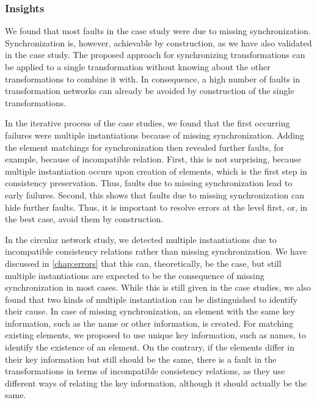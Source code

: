 \subsubsection{Insights}

We found that most faults in the case study were due to missing synchronization.
Synchronization is, however, achievable by construction, as we have also validated in the case study.
The proposed approach for synchronizing transformations can be applied to a single transformation without knowing about the other transformations to combine it with.
In consequence, a high number of faults in transformation networks can already be avoided by construction of the single transformations.

In the iterative process of the case studies, we found that the first occurring failures were multiple instantiations because of missing synchronization.
Adding the element matchings for synchronization then revealed further faults, for example, because of incompatible relation.
First, this is not surprising, because multiple instantiation occurs upon creation of elements, which is the first step in consistency preservation.
Thus, faults due to missing synchronization lead to early failures.
Second, this shows that faults due to missing synchronization can hide further faults.
Thus, it is important to resolve errors at the \leveltransformation level first, or, in the best case, avoid them by construction.

In the circular network study, we detected multiple instantiations due to incompatible consistency relations rather than missing synchronization.
We have discussed in \autoref{chap:errors} that this can, theoretically, be the case, but still multiple instantiations are expected to be the consequence of missing synchronization in most cases.
While this is still given in the case studies, we also found that two kinds of multiple instantiation can be distinguished to identify their cause.
In case of missing synchronization, an element with the same key information, such as the name or other information, is created.
For matching existing elements, we proposed to use unique key information, such as names, to identify the existence of an element.
On the contrary, if the elements differ in their key information but still should be the same, there is a fault in the transformations in terms of incompatible consistency relations, as they use different ways of relating the key information, although it should actually be the same.

